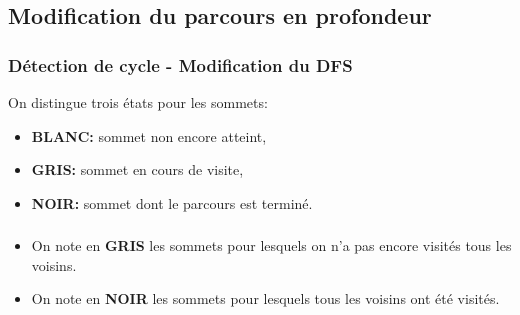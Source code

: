 \documentclass[svgnames,11pt]{beamer}
\begin{document}
\subsection{Modification du parcours en profondeur}
\begin{frame}
    \frametitle{Détection de cycle - Modification du DFS}

    On distingue trois états pour les sommets:
    \begin{itemize}
        \item \textbf{BLANC:} sommet non encore atteint,
        \item \textbf{GRIS:} sommet en cours de visite,
        \item \textbf{NOIR:} sommet dont le parcours est terminé.
    \end{itemize}

\end{frame}
\begin{frame}
    \frametitle{}

    \begin{aretenir}[]
        \begin{itemize}
            \item On note en \textbf{GRIS} les sommets pour lesquels on n'a pas encore visités tous les voisins.
            \item On note en \textbf{NOIR} les sommets pour lesquels tous les voisins ont été visités.
        \end{itemize}
    \end{aretenir}

\end{frame}
\end{document}
